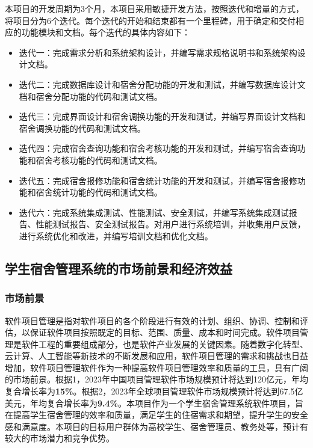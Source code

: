 \documentclass[UTF-8]{ctexart}
\begin{document}
本项目的开发周期为3个月，本项目采用敏捷开发方法，按照迭代和增量的方式，将项目分为6个迭代。每个迭代的开始和结束都有一个里程碑，用于确定和交付相应的功能模块和文档。每个迭代的具体内容如下：
\begin{itemize}

\item 迭代一：完成需求分析和系统架构设计，并编写需求规格说明书和系统架构设计文档。
\item 迭代二：完成数据库设计和宿舍分配功能的开发和测试，并编写数据库设计文档和宿舍分配功能的代码和测试文档。
\item 迭代三：完成界面设计和宿舍调换功能的开发和测试，并编写界面设计文档和宿舍调换功能的代码和测试文档。
\item 迭代四：完成宿舍查询功能和宿舍考核功能的开发和测试，并编写宿舍查询功能和宿舍考核功能的代码和测试文档。
\item 迭代五：完成宿舍报修功能和宿舍统计功能的开发和测试，并编写宿舍报修功能和宿舍统计功能的代码和测试文档。
\item 迭代六：完成系统集成测试、性能测试、安全测试，并编写系统集成测试报告、性能测试报告、安全测试报告。对用户进行系统培训，并收集用户反馈，进行系统优化和改进，并编写培训文档和优化文档。

\end{itemize}

\subsection{学生宿舍管理系统的市场前景和经济效益}

\subsubsection{市场前景}

软件项目管理是指对软件项目的各个阶段进行有效的计划、组织、协调、控制和评估，以保证软件项目按照既定的目标、范围、质量、成本和时间完成。软件项目管理是软件工程的重要组成部分，也是软件产业发展的关键因素。随着数字化转型、云计算、人工智能等新技术的不断发展和应用，软件项目管理的需求和挑战也日益增加，软件项目管理软件作为一种提高软件项目管理效率和质量的工具，具有广阔的市场前景。根据1，2023年中国项目管理软件市场规模预计将达到120亿元，年均复合增长率为\textbf{15\%}。根据2，2023年全球项目管理软件市场规模预计将达到67.5亿美元，年均复合增长率为\textbf{9.4\%}。本项目作为一个学生宿舍管理系统软件项目，旨在提高学生宿舍管理的效率和质量，满足学生的住宿需求和期望，提升学生的安全感和满意度。本项目的目标用户群体为高校学生、宿舍管理员、教务处等，预计有较大的市场潜力和竞争优势。
\end{document}
